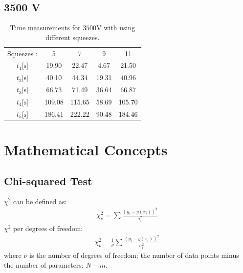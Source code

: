 \documentclass[reprint,amsmath,aps,nofootinbib,english]{revtex4-2}
\begin{document}
\subsection{3500 V}

\begin{table}[H]
\caption{\label{tab:kv35}%
Time measurements for $3500\si{\volt}$ with using different squeezes.
}
\begin{ruledtabular}
\begin{tabular}{ccccc}
\textrm{Squeezes :} &
\textrm{5} &
\textrm{7} &
\textrm{9} &
\textrm{11} \\ 
\colrule  
\textit{$t_1$}\hspace{1mm}[$\si{\second}]$& 19.90     & 22.47      & 4.67   & 21.50 \\ 
\textit{$t_2$}\hspace{1mm}[$\si{\second}]$& 40.10     & 44.34      & 19.31  & 40.96 \\ 
\textit{$t_3$}\hspace{1mm}[$\si{\second}]$& 66.73     & 71.49      & 36.64  & 66.87 \\ 
\textit{$t_4$}\hspace{1mm}[$\si{\second}]$& 109.08    & 115.65     & 58.69  & 105.70 \\ 
\textit{$t_5$}\hspace{1mm}[$\si{\second}]$& 186.41    & 222.22     & 90.48  & 184.46
\end{tabular}  
\end{ruledtabular}
\end{table}



\section{Mathematical Concepts}

\subsection{Chi-squared Test}
$\chi^2$ can be defined as:
\begin{align}
  \chi^2_\nu = \sum \frac{(y_i -y(x_i))^2}{\sigma^2_i}
\end{align}
$\chi^2$ per degrees of freedom:
\begin{align}
  \chi^2_\nu = \frac{1}{\nu} \sum \frac{(y_i -y(x_i))^2}{\sigma^2_i}
\end{align}
where $\nu$ is the number of degrees of freedom; the number of data points minus the number of parameters: $N-m$.
\end{document}

